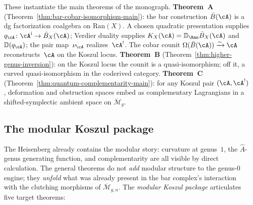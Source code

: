 These instantiate the main theorems of the monograph.
\textbf{Theorem~A}
(Theorem~\ref{thm:bar-cobar-isomorphism-main}):
the bar construction $\bar{B}(\cA)$ is a dg factorization
coalgebra on $\mathrm{Ran}(X)$. A chosen quadratic presentation
supplies $q_\cA\colon\cA^{\mathrm i}\to\bar B_X(\cA)$; Verdier
duality supplies $K_X(\cA)=\mathbb D_{\Ran}\bar B_X(\cA)$ and
$\mathbb D(q_\cA)$; the pair map~$\nu_\cA$ realizes~$\cA^!$.
The cobar counit
$\Omega(\bar{B}(\cA)) \xrightarrow{\sim} \cA$ reconstructs~$\cA$ on
the Koszul locus.
\textbf{Theorem~B}
(Theorem~\ref{thm:higher-genus-inversion}):
on the Koszul locus the counit is a quasi-isomorphism; off
it, a curved quasi-isomorphism in the coderived category.
\textbf{Theorem~C}
(Theorem~\ref{thm:quantum-complementarity-main}):
for any Koszul pair $(\cA, \cA^!)$, deformation and
obstruction spaces embed as complementary Lagrangians in a
shifted-symplectic ambient space on
$\overline{\mathcal{M}}_g$.

\subsection{The modular Koszul package}

The Heisenberg already contains the modular story: curvature at
genus~$1$, the $\hat{A}$-genus generating function, and
complementarity are all visible by direct calculation. The general
theorems do not \emph{add} modular structure to the genus-$0$ engine;
they \emph{unfold} what was already present in the bar complex's
interaction with the clutching morphisms of
$\overline{\mathcal{M}}_{g,n}$. The \emph{modular Koszul package}
articulates five target theorems:

